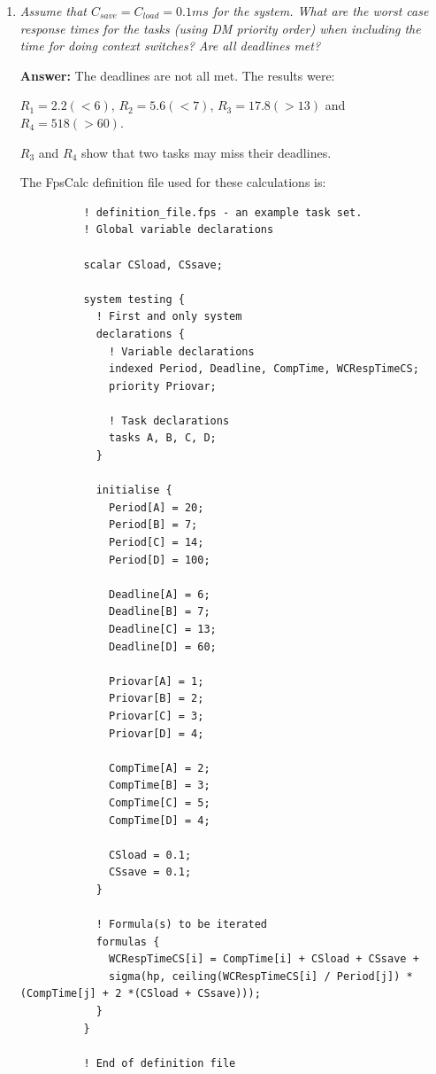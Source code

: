 \documentclass[a4paper,10pt]{article}
\newcommand{\answer}{\textbf{Answer: }}
\begin{document}
\begin{enumerate}
	\item \emph{Assume that $C_{save} = C_{load} = 0.1 ms$ for the system. What are the worst case response times for the tasks (using DM priority order) when including the time for doing context switches? Are all deadlines met?}
	
	\answer The deadlines are not all met. The results were:
	
	$R_1 = 2.2 (<6)$, $R_2 = 5.6 (<7)$, $R_3 = 17.8 (>13)$ and $R_4 = 518 (>60)$.
	
	$R_3$ and $R_4$ show that two tasks may miss their deadlines.

        The FpsCalc definition file used for these calculations is:

        \begin{lstlisting}
          ! definition_file.fps - an example task set.
          ! Global variable declarations
          
          scalar CSload, CSsave;
          
          system testing {
            ! First and only system
            declarations {		
              ! Variable declarations
              indexed Period, Deadline, CompTime, WCRespTimeCS;
              priority Priovar;	
              
              ! Task declarations
              tasks A, B, C, D;
            }
            
            initialise {
              Period[A] = 20;
              Period[B] = 7;
              Period[C] = 14;
              Period[D] = 100;
              
              Deadline[A] = 6;
              Deadline[B] = 7;
              Deadline[C] = 13;
              Deadline[D] = 60;
              
              Priovar[A] = 1;
              Priovar[B] = 2;
              Priovar[C] = 3;
              Priovar[D] = 4;
              
              CompTime[A] = 2;
              CompTime[B] = 3;
              CompTime[C] = 5;
              CompTime[D] = 4;
              
              CSload = 0.1;
              CSsave = 0.1;
            }
            
            ! Formula(s) to be iterated
            formulas {
              WCRespTimeCS[i] = CompTime[i] + CSload + CSsave + 
              sigma(hp, ceiling(WCRespTimeCS[i] / Period[j]) * (CompTime[j] + 2 *(CSload + CSsave))); 
            }
          }				   
          
          ! End of definition file
        \end{lstlisting}
	
\end{enumerate}
\end{document}
